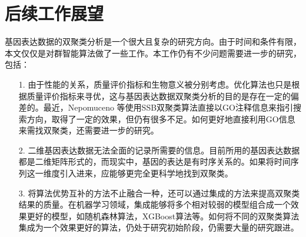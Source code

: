 \section{后续工作展望}
基因表达数据的双聚类分析是一个很大且复杂的研究方向。由于时间和条件有限，本文仅仅是对群智能算法做了一些工作。本工作仍有不少问题需要进一步的研究，包括：
\begin{itemize}
    \item [1.]{由于性能的关系，质量评价指标和生物意义被分别考虑。优化算法也只是根据质量评价指标来寻优，这与基因表达数据双聚类分析的目的是存在一定的偏差的。最近，Nepomuceno 等使用SSB双聚类算法直接以GO注释信息来指引搜索方向，取得了一定的效果，但仍有很多不足。如何更好地直接利用GO信息来需找双聚类，还需要进一步的研究。}

    \item [2.]{二维基因表达数据无法全面的记录所需要的信息。目前所用的基因表达数据都是二维矩阵形式的，而现实中，基因的表达是有时序关系的。如果将时间序列这一维度引入进来，应能够更完全更科学地找到双聚类。}

    \item [3.]{将算法优势互补的方法不止融合一种，还可以通过集成的方法来提高双聚类结果的质量。在机器学习领域，集成能够将多个相对较弱的模型组合成一个效果更好的模型，如随机森林算法，XGBoost算法等。如何将不同的双聚类算法集成为一个效果更好的算法，仍处于研究初始阶段，仍需要大量的研究跟进。}
    
\end{itemize}